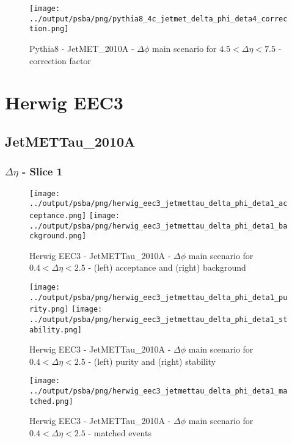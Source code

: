 \documentclass[11pt]{book}
\begin{document}
\begin{figure}[ht]
\centering
\texttt{[image: ../output/psba/png/pythia8\_4c\_jetmet\_delta\_phi\_deta4\_correction.png]}
\caption{Pythia8 - JetMET\_2010A - $\Delta\phi$ main scenario for $4.5 < \Delta\eta < 7.5$ - correction factor}
\label{fig:p8_jetmet_delta_phi_deta4_correction}
\end{figure}


\clearpage
\section{Herwig EEC3}
\subsection{JetMETTau\_2010A}

\subsubsection{$\Delta\eta$ - Slice 1}

\begin{figure}[ht]
\centering
\texttt{[image: ../output/psba/png/herwig\_eec3\_jetmettau\_delta\_phi\_deta1\_acceptance.png]}
\texttt{[image: ../output/psba/png/herwig\_eec3\_jetmettau\_delta\_phi\_deta1\_background.png]}
\caption{Herwig EEC3 - JetMETTau\_2010A - $\Delta\phi$ main scenario for $0.4 < \Delta\eta < 2.5$ - (left) acceptance and (right) background}
\label{fig:hw_eec3_jetmettau_delta_phi_deta1_ab}
\end{figure}

\begin{figure}[ht]
\centering
\texttt{[image: ../output/psba/png/herwig\_eec3\_jetmettau\_delta\_phi\_deta1\_purity.png]}
\texttt{[image: ../output/psba/png/herwig\_eec3\_jetmettau\_delta\_phi\_deta1\_stability.png]}
\caption{Herwig EEC3 - JetMETTau\_2010A - $\Delta\phi$ main scenario for $0.4 < \Delta\eta < 2.5$ - (left) purity and (right) stability}
\label{fig:hw_eec3_jetmettau_delta_phi_deta1_ps}
\end{figure}

\begin{figure}[ht]
\centering
\texttt{[image: ../output/psba/png/herwig\_eec3\_jetmettau\_delta\_phi\_deta1\_matched.png]}
\caption{Herwig EEC3 - JetMETTau\_2010A - $\Delta\phi$ main scenario for $0.4 < \Delta\eta < 2.5$ - matched events}
\label{fig:hw_eec3_jetmettau_delta_phi_deta1_matched}
\end{figure}
\end{document}
